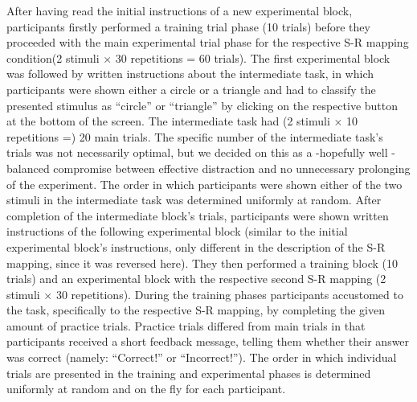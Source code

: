 \documentclass[
  english,
  man,floatsintext]{apa6}
\begin{document}
After having read the initial instructions of a new experimental block, participants firstly performed a training trial phase (10 trials) before they proceeded with the main experimental trial phase for the respective S-R mapping condition(2 stimuli × 30 repetitions = 60 trials). The first experimental block was followed by written instructions about the intermediate task, in which participants were shown either a circle or a triangle and had to classify the presented stimulus as \enquote{circle} or \enquote{triangle} by clicking on the respective button at the bottom of the screen. The intermediate task had (2 stimuli × 10 repetitions =) 20 main trials. The specific number of the intermediate task's trials was not necessarily optimal, but we decided on this as a -hopefully well - balanced compromise between effective distraction and no unnecessary prolonging of the experiment. The order in which participants were shown either of the two stimuli in the intermediate task was determined uniformly at random. After completion of the intermediate block's trials, participants were shown written instructions of the following experimental block (similar to the initial experimental block's instructions, only different in the description of the S-R mapping, since it was reversed here). They then performed a training block (10 trials) and an experimental block with the respective second S-R mapping (2 stimuli × 30 repetitions).
During the training phases participants accustomed to the task, specifically to the respective S-R mapping, by completing the given amount of practice trials. Practice trials differed from main trials in that participants received a short feedback message, telling them whether their answer was correct (namely: \enquote{Correct!} or \enquote{Incorrect!}).
The order in which individual trials are presented in the training and experimental phases is determined uniformly at random and on the fly for each participant.
\end{document}
